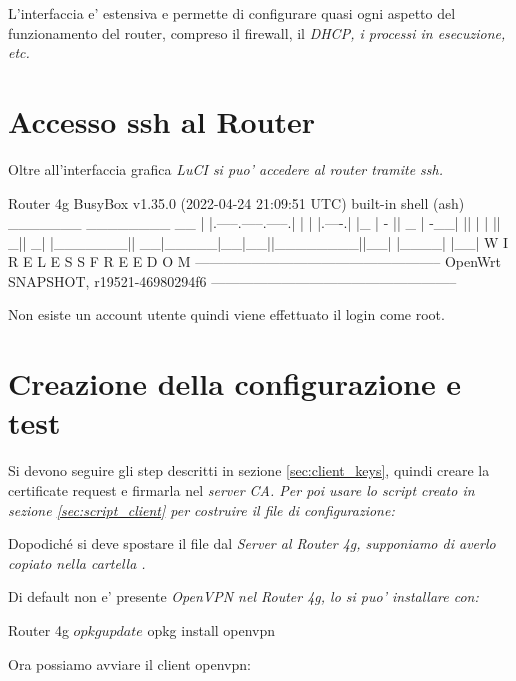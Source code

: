 L'interfaccia e' estensiva e permette di configurare quasi ogni aspetto del funzionamento del router, compreso il firewall, il \it{DHCP}, i processi in esecuzione, etc. 

\section{Accesso ssh al Router}

Oltre all'interfaccia grafica \it{LuCI} si puo' accedere al router tramite ssh.

\begin{bashcode}{Router 4g}{}
BusyBox v1.35.0 (2022-04-24 21:09:51 UTC) built-in shell (ash)
    _______                     ________        __
    |       |.-----.-----.-----.|  |  |  |.----.|  |_
    |   -   ||  _  |  -__|     ||  |  |  ||   _||   _|
    |_______||   __|_____|__|__||________||__|  |____|
            |__| W I R E L E S S   F R E E D O M
    -----------------------------------------------------
    OpenWrt SNAPSHOT, r19521-46980294f6
    -----------------------------------------------------
\end{bashcode}

Non esiste un account utente quindi viene effettuato il login come root.

\section{Creazione della configurazione e test}

Si devono seguire gli step descritti in sezione \ref{sec:client_keys}, quindi creare la certificate request e firmarla nel \it{server CA}. Per poi usare lo script creato in sezione \ref{sec:script_client} per costruire il file di configurazione:


Dopodiché si deve spostare il file  dal \it{Server} al \it{Router 4g}, supponiamo di averlo copiato nella cartella . 

Di default non e' presente \it{OpenVPN} nel \it{Router 4g}, lo si puo' installare con:

\begin{bashcode}{Router 4g}{}
$ opkg update
$ opkg install openvpn
\end{bashcode}

Ora possiamo avviare il client openvpn:

